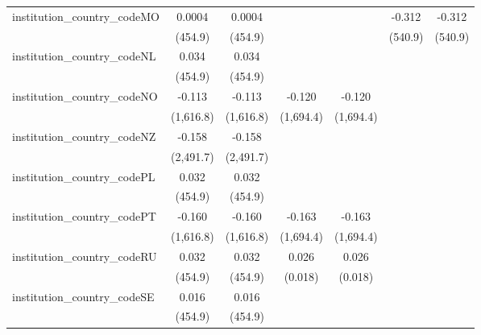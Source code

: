 \begin{tabular}{lcccccc}
   institution\_country\_codeMO          & 0.0004        & 0.0004        &                &                & -0.312    & -0.312\\   
                                         & (454.9)       & (454.9)       &                &                & (540.9)   & (540.9)\\   
   institution\_country\_codeNL          & 0.034         & 0.034         &                &                &           &   \\   
                                         & (454.9)       & (454.9)       &                &                &           &   \\   
   institution\_country\_codeNO          & -0.113        & -0.113        & -0.120         & -0.120         &           &   \\   
                                         & (1,616.8)     & (1,616.8)     & (1,694.4)      & (1,694.4)      &           &   \\   
   institution\_country\_codeNZ          & -0.158        & -0.158        &                &                &           &   \\   
                                         & (2,491.7)     & (2,491.7)     &                &                &           &   \\   
   institution\_country\_codePL          & 0.032         & 0.032         &                &                &           &   \\   
                                         & (454.9)       & (454.9)       &                &                &           &   \\   
   institution\_country\_codePT          & -0.160        & -0.160        & -0.163         & -0.163         &           &   \\   
                                         & (1,616.8)     & (1,616.8)     & (1,694.4)      & (1,694.4)      &           &   \\   
   institution\_country\_codeRU          & 0.032         & 0.032         & 0.026          & 0.026          &           &   \\   
                                         & (454.9)       & (454.9)       & (0.018)        & (0.018)        &           &   \\   
   institution\_country\_codeSE          & 0.016         & 0.016         &                &                &           &   \\   
                                         & (454.9)       & (454.9)       &                &                &           &   \\   

\end{tabular}
